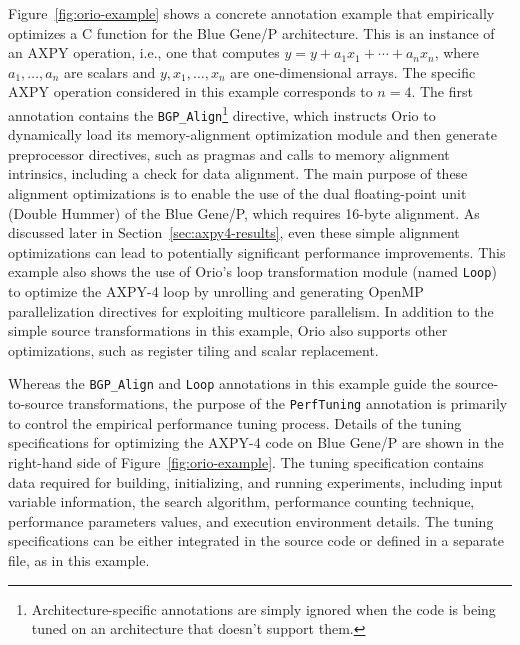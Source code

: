 Figure~\ref{fig:orio-example} shows a concrete annotation example that
empirically optimizes a C function for the Blue Gene/P
architecture. This is an instance of an AXPY operation, i.e., one that computes
$y=y+a_1 x_1+\cdots+a_n x_n$, where $a_1,\ldots,a_n$ are scalars and
$y,x_1,\ldots,x_n$ are one-dimensional arrays. The specific AXPY operation
considered in this example corresponds to $n=4$. The first annotation contains the
\texttt{BGP\_Align}\footnote{Architecture-specific annotations are simply ignored when the
code is being tuned on an architecture that doesn't support them.} directive,
which instructs Orio to dynamically load its memory-alignment optimization
module and then generate preprocessor directives, such as pragmas and calls
to memory alignment intrinsics, including a check for data alignment. The
main purpose of these alignment optimizations is to enable the use of the
dual floating-point unit (Double Hummer) of the Blue Gene/P, which requires
16-byte alignment. As discussed later in Section~\ref{sec:axpy4-results},
even these simple alignment optimizations can lead to potentially significant
performance improvements. This example also shows the use of Orio's loop
transformation module (named \texttt{Loop}) to optimize the AXPY-4 loop by
unrolling and generating OpenMP parallelization directives for exploiting
multicore parallelism. In addition to the simple source transformations in
this example, Orio also supports other optimizations, such as register
tiling and scalar replacement.

Whereas the \texttt{BGP\_Align} and \texttt{Loop} annotations in this example
guide the source-to-source transformations, the purpose of the
\texttt{PerfTuning} annotation is primarily to control the empirical
performance tuning process. Details of the tuning specifications for
optimizing the AXPY-4 code on Blue Gene/P are shown in the right-hand side of
Figure~\ref{fig:orio-example}.  The tuning specification contains data
required for building, initializing, and running experiments, including input
variable information, the search algorithm, performance counting technique,
performance parameters values, and execution environment details.  The tuning
specifications can be either integrated in the source code or defined in a
separate file, as in this example.

